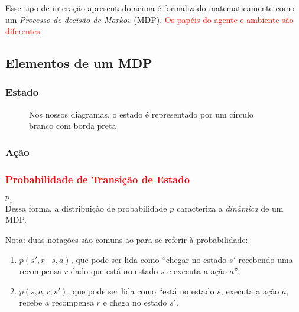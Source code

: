 \documentclass{article}
\begin{document}
        Esse tipo de interação apresentado acima é formalizado matematicamente como um \emph{Processo de decisão de Markov} (MDP). \textcolor{red}{Os papéis do agente e ambiente são diferentes}.
    
        \subsection{Elementos de um MDP}
    
            \subsubsection{Estado}
            
                \begin{figure}[ht]
                    \centering
                    \caption{Nos nossos diagramas, o estado é representado por um círculo branco com borda preta}
                    \label{diag:state-node}
                \end{figure}
                
            \subsubsection{Ação}
            
                
            \subsubsection{\textcolor{red}{Probabilidade de Transição de Estado}}
            
                $p_1$ \\
            
                Dessa forma, a distribuição de probabilidade $p$ caracteriza a \emph{dinâmica} de um MDP.
            
                Nota: duas notações são comuns ao para se referir à probabilidade:
                
                \begin{enumerate}
                    \item $p(s', r \mid s, a)$, que pode ser lida como ``chegar no estado $s'$ recebendo uma recompensa $r$ dado que está no estado $s$ e executa a ação $a$'';
                    \item $p(s, a, r, s')$, que pode ser lida como ``está no estado $s$, executa a ação $a$, recebe a recompensa $r$ e chega no estado $s'$.
                \end{enumerate}
                
\end{document}
